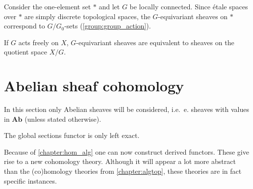 
    \begin{example}[$G$-sets]
        Consider the one-element set $\ast$ and let $G$ be locally connected. Since \'etale spaces over $\ast$ are simply discrete topological spaces, the $G$-equivariant sheaves on $\ast$ correspond to $G/G_0$-sets (\cref{group:group_action}).
    \end{example}

    \begin{example}
        If $G$ acts freely on $X$, $G$-equivariant sheaves are equivalent to sheaves on the quotient space $X/G$.
    \end{example}

\section{Abelian sheaf cohomology}

    In this section only Abelian sheaves will be considered, i.e.~e. sheaves with values in $\mathbf{Ab}$ (unless stated otherwise).

    \begin{property}\label{sheaf:left_exact_functor}
        The global sections functor is only left exact.
    \end{property}

    Because of \cref{chapter:hom_alg} one can now construct derived functors. These give rise to a new cohomology theory. Although it will appear a lot more abstract than the (co)homology theories from \cref{chapter:algtop}, these theories are in fact specific instances.

